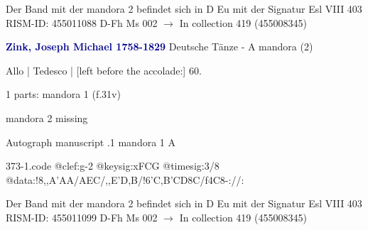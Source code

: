\documentclass[twocolumn]{book}
\begin{document}
\newline Der Band mit der mandora 2 befindet sich in D Eu mit der Signatur Esl VIII 403
\newline RISM-ID: 455011088
\newline D-Fh  Ms 002
\newline $\rightarrow$ In collection 419 (455008345)
      
\newline \par \vspace{7pt} \textcolor{darkblue}{\textbf{Zink, Joseph Michael  1758-1829}}
\newline Deutsche Tänze - A
\newline mandora (2)
\newline \begin{itshape}[f.31v, at left:] Allo | Tedesco | [left before the accolade:] 60.\end{itshape} 
\newline \textcolor{darkblue}{}  1 parts: mandora 1  (f.31v)
\newline \begin{small} mandora 2 missing\end{small} 
\newline Autograph manuscript
.1  mandora 1  A  
\begin{filecontents*}{373-1.code}
@clef:g-2
@keysig:xFCG
@timesig:3/8
@data:!8,,A'AA/AEC/,,E'D,B/!{6'C,B'CD8C}/f4C8-://:
\end{filecontents*}
\newline
%

\newline Der Band mit der mandora 2 befindet sich in D Eu mit der Signatur Esl VIII 403
\newline RISM-ID: 455011099
\newline D-Fh  Ms 002
\newline $\rightarrow$ In collection 419 (455008345)
      
\end{document}
